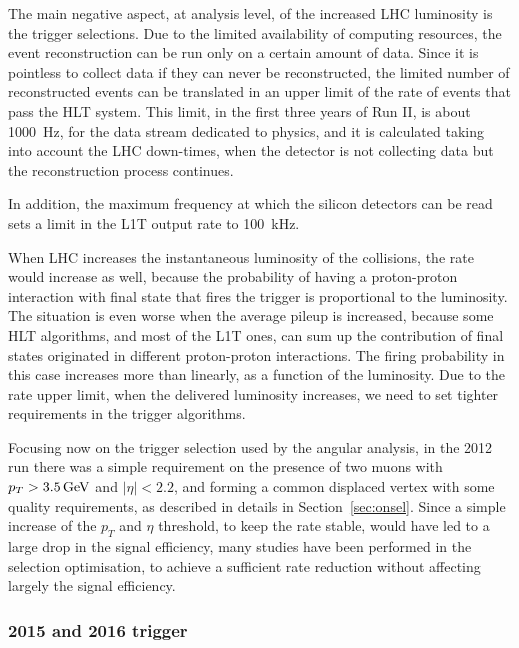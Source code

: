 The main negative aspect, at analysis level, of the increased LHC luminosity is the trigger selections.
Due to the limited availability of computing resources, the event reconstruction can be run only on a certain amount of data.
Since it is pointless to collect data if they can never be reconstructed, the limited number of reconstructed events can be translated in an upper limit of the rate of events that pass the HLT system.
This limit, in the first three years of Run II, is about \SI{1000}{\hertz}, for the data stream dedicated to physics, and it is calculated taking into account the LHC down-times, when the detector is not collecting data but the reconstruction process continues.

In addition, the maximum frequency at which the silicon detectors can be read sets a limit in the L1T output rate to \SI{100}{\kilo\hertz}.

When LHC increases the instantaneous luminosity of the collisions, the rate would increase as well, because the probability of having a proton-proton interaction with final state that fires the trigger is proportional to the luminosity.
The situation is even worse when the average pileup is increased, because some HLT algorithms, and most of the L1T ones, can sum up the contribution of final states originated in different proton-proton interactions.
The firing probability in this case increases more than linearly, as a function of the luminosity.
Due to the rate upper limit, when the delivered luminosity increases, we need to set tighter requirements in the trigger algorithms.

Focusing now on the trigger selection used by the \BtoKstmumu angular analysis, in the 2012 run there was a simple requirement on the presence of two muons with $p_T>3.5\,\textrm{GeV}$ and $|\eta|<2.2$, and forming a common displaced vertex with some quality requirements, as described in details in Section~\ref{sec:onsel}.
Since a simple increase of the $p_T$ and $\eta$ threshold, to keep the rate stable, would have led to a large drop in the signal efficiency, many studies have been performed in the selection optimisation, to achieve a sufficient rate reduction without affecting largely the signal efficiency.

\subsubsection{2015 and 2016 trigger}
\label{sec:2016}

